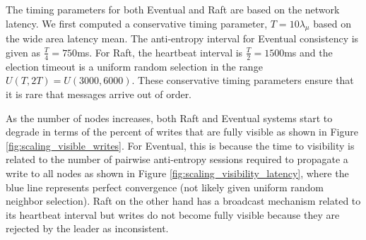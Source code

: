 \documentclass{article}
\begin{document}
The timing parameters for both Eventual and Raft are based on the network latency. We first computed a conservative timing parameter, $T=10\lambda_{\mu}$ based on the wide area latency mean. The anti-entropy interval for Eventual consistency is given as $\frac {T} {4} = 750$ms. For Raft, the heartbeat interval is $\frac {T} {2} = 1500$ms and the election timeout is a uniform random selection in the range $U(T, 2T) = U(3000, 6000)$. These conservative timing parameters ensure that it is rare that messages arrive out of order.

As the number of nodes increases, both Raft and Eventual systems start to degrade in terms of the percent of writes that are fully visible as shown in Figure \ref{fig:scaling_visible_writes}. For Eventual, this is because the time to visibility is related to the number of pairwise anti-entropy sessions required to propagate a write to all nodes as shown in Figure \ref{fig:scaling_visibility_latency}, where the blue line represents perfect convergence (not likely given uniform random neighbor selection). Raft on the other hand has a broadcast mechanism related to its heartbeat interval but writes do not become fully visible because they are rejected by the leader as inconsistent.
\end{document}
